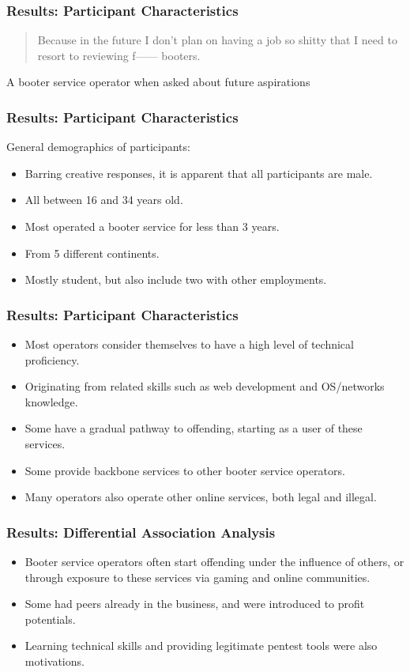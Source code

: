 \documentclass[aspectratio=1610]{beamer}
\begin{document}

\begin{frame}
\frametitle{Results: Participant Characteristics}
\begin{quote}
Because in the future I don't plan on having a job so shitty that I need to resort to reviewing f------ booters. 
\end{quote}
\begin{flushright} A booter service operator when asked about future aspirations \end{flushright} 
\end{frame}

\begin{frame}
\frametitle{Results: Participant Characteristics}
General demographics of participants: \par
\begin{itemize}
\setlength\itemsep{1em}
\item Barring creative responses, it is apparent that all participants are male. 
\item All between 16 and 34 years old.
\item Most operated a booter service for less than 3 years.
\item From 5 different continents.
\item Mostly student, but also include two with other employments.
\end{itemize}
\end{frame}

\begin{frame}
\frametitle{Results: Participant Characteristics}
\begin{itemize}
\setlength\itemsep{1em}
\item Most operators consider themselves to have a high level of technical proficiency.
\item Originating from related skills such as web development and OS/networks knowledge.
\item Some have a gradual pathway to offending, starting as a user of these services.
\item Some provide backbone services to other booter service operators.
\item Many operators also operate other online services, both legal and illegal.
\end{itemize}
\end{frame}


\begin{frame}
\frametitle{Results: Differential Association Analysis}
\begin{itemize}
\setlength\itemsep{1em}
\item Booter service operators often start offending under the influence of others, or through exposure to these services via gaming and online communities.
\item Some had peers already in the business, and were introduced to profit potentials.
\item Learning technical skills and providing legitimate pentest tools were also motivations.
\end{itemize}
\end{frame}
\end{document}
